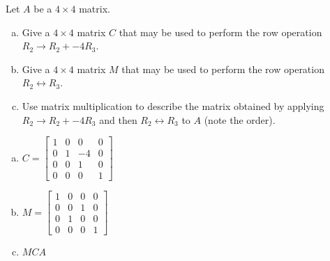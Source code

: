 
\begin{exerciseStatement}


Let \(A\) be a \(4 \times 4\) matrix.


\begin{enumerate}[(a)]
\item Give a \(4 \times 4\) matrix \(C\) that may be used to perform the row operation \( R_2 \to R_2 + -4R_3 \).
\item Give a \(4 \times 4\) matrix \(M\) that may be used to perform the row operation \( R_2 \leftrightarrow R_3 \).
\item Use matrix multiplication to describe the matrix obtained by applying \( R_2 \to R_2 + -4R_3 \) and then \( R_2 \leftrightarrow R_3 \) to \(A\) (note the order). 
\end{enumerate}
    
\end{exerciseStatement}
    
\begin{exerciseAnswer} 

\begin{enumerate}[(a)]
\item \(C= \left[\begin{array}{cccc}
1 & 0 & 0 & 0 \\
0 & 1 & -4 & 0 \\
0 & 0 & 1 & 0 \\
0 & 0 & 0 & 1
\end{array}\right] \)
\item \(M= \left[\begin{array}{cccc}
1 & 0 & 0 & 0 \\
0 & 0 & 1 & 0 \\
0 & 1 & 0 & 0 \\
0 & 0 & 0 & 1
\end{array}\right] \)
\item \(MCA\)
\end{enumerate}
    
\end{exerciseAnswer}
    
